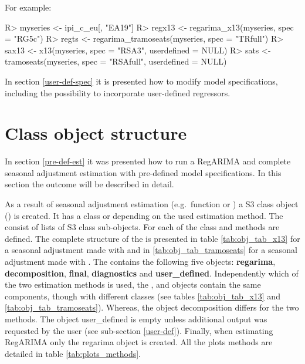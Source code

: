 \documentclass[article]{jss}
\begin{document}
For example:

\begin{CodeChunk}

\begin{CodeInput}
R> myseries <- ipi_c_eu[, "EA19"]
R> regx13 <- regarima_x13(myseries, spec = "RG5c")
R> regts <- regarima_tramoseats(myseries, spec = "TRfull")
R> sax13 <- x13(myseries, spec = "RSA3", userdefined = NULL)
R> sats <- tramoseats(myseries, spec = "RSAfull", userdefined = NULL)
\end{CodeInput}
\end{CodeChunk}

In section \ref{user-def-spec} it is presented how to modify model
specifications, including the possibility to incorporate user-defined
regressors.

\hypertarget{sa-obj-struc}{%
\section{Class object structure}\label{sa-obj-struc}}

In section \ref{pre-def-est} it was presented how to run a RegARIMA and
complete seasonal adjustment estimation with pre-defined model
specifications. In this section the outcome will be described in detail.

As a result of seasonal adjustment estimation (e.g.~function 
or ) a S3 class object () is created.
It has a class  or 
depending on the used estimation method. The  consist of
lists of S3 class sub-objects. For each of the class  and
 methods are defined. The complete structure of the
 is presented in table \ref{tab:obj_tab_x13} for a
seasonal adjustment made with  and in
\ref{tab:obj_tab_tramoseats} for a seasonal adjustment made with
. The  contains the following five
objects: \textbf{regarima}, \textbf{decomposition}, \textbf{final},
\textbf{diagnostics} and \textbf{user\_defined}. Independently which of
the two estimation methods is used, the , 
and  objects contain the same components, though with
different classes (see tables \ref{tab:obj_tab_x13} and
\ref{tab:obj_tab_tramoseats}). Whereas, the object decomposition differs
for the two methods. The object user\_defined is empty unless additional
output was requested by the user (see sub-section \ref{user-def}).
Finally, when estimating RegARIMA only the regarima object is created.
All the plots methods are detailed in table \ref{tab:plots_methods}.
\end{document}
